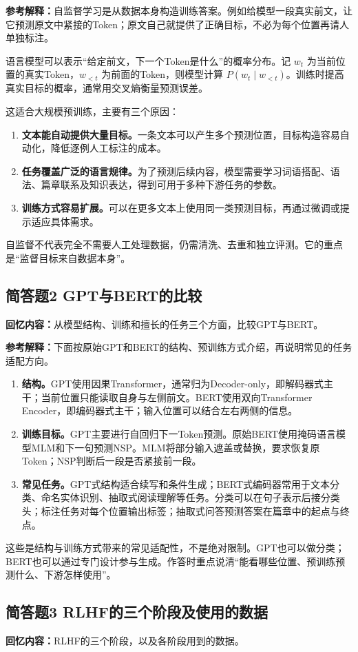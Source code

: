 \documentclass[UTF8,a4paper,zihao=-4,fontset=windows]{ctexart}
\newcommand{\recalled}[1]{\Needspace{8\baselineskip}\subsection*{#1}}
\begin{document}
\textbf{参考解释：}自监督学习是从数据本身构造训练答案。例如给模型一段真实前文，让它预测原文中紧接的Token；原文自己就提供了正确目标，不必为每个位置再请人单独标注。

语言模型可以表示“给定前文，下一个Token是什么”的概率分布。记 $w_t$ 为当前位置的真实Token，$w_{<t}$ 为前面的Token，则模型计算 $P(w_t\mid w_{<t})$。训练时提高真实目标的概率，通常用交叉熵衡量预测误差。

这适合大规模预训练，主要有三个原因：
\begin{enumerate}
\item {}\textbf{文本能自动提供大量目标。}一条文本可以产生多个预测位置，目标构造容易自动化，降低逐例人工标注的成本。
\item {}\textbf{任务覆盖广泛的语言规律。}为了预测后续内容，模型需要学习词语搭配、语法、篇章联系及知识表达，得到可用于多种下游任务的参数。
\item {}\textbf{训练方式容易扩展。}可以在更多文本上使用同一类预测目标，再通过微调或提示适应具体需求。
\end{enumerate}
自监督不代表完全不需要人工处理数据，仍需清洗、去重和独立评测。它的重点是“监督目标来自数据本身”。

\recalled{简答题2 GPT与BERT的比较}
\textbf{回忆内容：}从模型结构、训练和擅长的任务三个方面，比较GPT与BERT。

\textbf{参考解释：}下面按原始GPT和BERT的结构、预训练方式介绍，再说明常见的任务适配方向。
\begin{enumerate}
\item {}\textbf{结构。}GPT使用因果Transformer，通常归为Decoder-only，即解码器式主干；当前位置只能读取自身与左侧前文。BERT使用双向Transformer Encoder，即编码器式主干；输入位置可以结合左右两侧的信息。
\item {}\textbf{训练目标。}GPT主要进行自回归下一Token预测。原始BERT使用掩码语言模型MLM和下一句预测NSP。MLM将部分输入遮盖或替换，要求恢复原Token；NSP判断后一段是否紧接前一段。
\item {}\textbf{常见任务。}GPT式结构适合续写和条件生成；BERT式编码器常用于文本分类、命名实体识别、抽取式阅读理解等任务。分类可以在句子表示后接分类头；标注任务对每个位置输出标签；抽取式问答预测答案在篇章中的起点与终点。
\end{enumerate}
这些是结构与训练方式带来的常见适配性，不是绝对限制。GPT也可以做分类；BERT也可以通过专门设计参与生成。作答时重点说清“能看哪些位置、预训练预测什么、下游怎样使用”。

\recalled{简答题3 RLHF的三个阶段及使用的数据}
\textbf{回忆内容：}RLHF的三个阶段，以及各阶段用到的数据。
\end{document}
